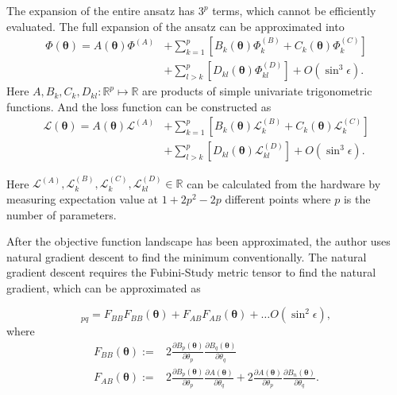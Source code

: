 The expansion of the entire ansatz has $3^p$ terms, which cannot be efficiently evaluated. The full expansion of the ansatz can be approximated into 
\begin{align} \label{full-circuit}
\Phi(\boldsymbol{\theta}) = A(\boldsymbol{\theta}) \Phi^{(A)} &+ \sum_{k=1}^p
[B_k(\boldsymbol{\theta}) \Phi^{(B)}_k + C_k(\boldsymbol{\theta}) \Phi^{(C)}_k] \\
&+\sum_{l>k}^p [ D_{kl}(\boldsymbol{\theta}) \Phi^{(D)}_{kl}] + O(\sin^3 \epsilon). \nonumber
\end{align}
Here $A, B_k, C_k, D_{kl} : \mathbb{R}^p \mapsto \mathbb{R}$ are products of simple univariate trigonometric functions. And the loss function can be constructed as
\begin{align} \label{full-energy}
\mathcal{L}(\boldsymbol{\theta}) = A(\boldsymbol{\theta}) \mathcal{L}^{(A)} &+ \sum_{k=1}^p
[B_k(\boldsymbol{\theta}) \mathcal{L}^{(B)}_k + C_k(\boldsymbol{\theta}) \mathcal{L}^{(C)}_k] \\
&+\sum_{l>k}^p [ D_{kl}(\boldsymbol{\theta}) \mathcal{L}^{(D)}_{kl}] + O(\sin^3 \epsilon). \nonumber
\end{align}

Here $\mathcal{L}^{(A)},\mathcal{L}^{(B)}_k,\mathcal{L}^{(C)}_k, \mathcal{L}^{(D)}_{kl} \in \mathbb{R}$ can be calculated from the hardware by measuring expectation value at $1 + 2p^2 -2 p$ different points where $p$ is the number of parameters. 

After the objective function landscape has been approximated, the author uses natural gradient descent to find the minimum conventionally. The natural gradient descent requires the Fubini-Study metric tensor to find the natural gradient, which can be approximated as 

\begin{equation}
[F_Q]_{pq} =
F_{BB} F_{BB}(\boldsymbol{\theta})
+ F_{AB} F_{AB}(\boldsymbol{\theta}) + \dots  O(\sin^2\epsilon),
\end{equation}
where
\begin{align}
	F_{BB}(\boldsymbol{\theta}) :=& 2\frac{\partial  B_p(\boldsymbol{\theta})}{\partial \theta_p}  \frac{\partial  B_q(\boldsymbol{\theta})}{\partial \theta_q}\\
	F_{AB}(\boldsymbol{\theta}) :=&  2\frac{\partial B_p(\boldsymbol{\theta}) }{\partial \theta_p}  \frac{\partial A(\boldsymbol{\theta}) }{\partial \theta_q} 
	+ 2 \frac{\partial A(\boldsymbol{\theta}) }{\partial \theta_p}  \frac{\partial B_n(\boldsymbol{\theta}) }{\partial \theta_q}.
\end{align}

